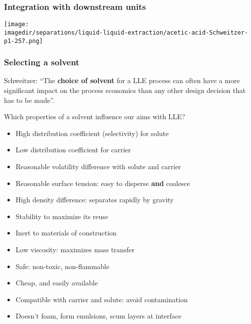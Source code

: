 \begin{frame}\frametitle{Integration with downstream units}
	\begin{center}
		\texttt{[image: \\imagedir/separations/liquid-liquid-extraction/acetic-acid-Schweitzer-p1-257.png]}
	\end{center}
	\vspace{-10pt}
\end{frame}

\begin{frame}\frametitle{Selecting a solvent}
	Schweitzer: ``The \textbf{choice of solvent} for a LLE process can often have a more significant impact on the process economics than any other design decision that has to be made''.

	\vspace{12pt}
	Which properties of a solvent influence our aims with LLE?
	\begin{itemize}
		\item	High distribution coefficient (selectivity) for solute
		\item	Low distribution coefficient for carrier
		\item	Reasonable volatility difference with solute and carrier
		\item	Reasonable surface tension: easy to disperse \textbf{and} coalesce
		\item	High density difference: separates rapidly by gravity
		\item	Stability to maximize its reuse
		\item	Inert to materials of construction
		\item	Low viscosity: maximizes mass transfer
		\item	Safe: non-toxic, non-flammable
		\item	Cheap, and easily available
		\item	Compatible with carrier and solute: avoid contamination
		\item	Doesn't foam, form emulsions, scum layers at interface
	\end{itemize}
\end{frame}

